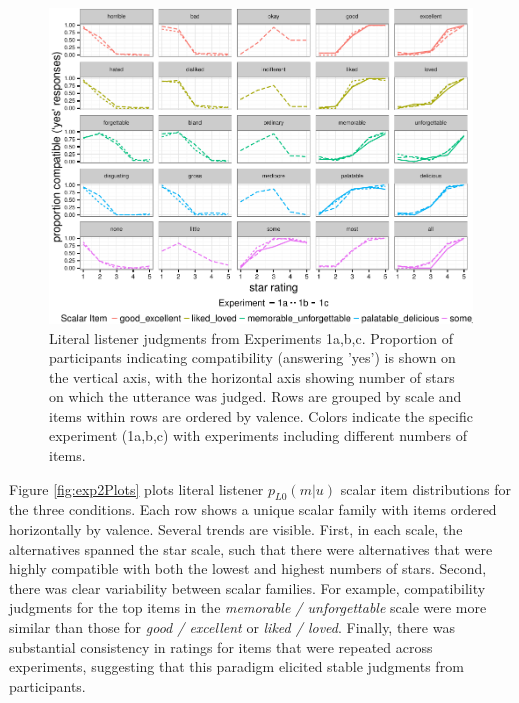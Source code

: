 \documentclass[10pt, letterpaper]{article}
\newenvironment{CodeChunk}{}{}
\begin{document}
\begin{CodeChunk}
\begin{figure}[t]

{\centering \includegraphics{figs/exp1Plots-1} 

}

\caption[Literal listener judgments from Experiments 1a,b,c]{Literal listener judgments from Experiments 1a,b,c. Proportion of participants indicating compatibility (answering 'yes') is shown on the vertical axis, with the horizontal axis showing number of stars on which the utterance was judged. Rows are grouped by scale and items within rows are ordered by valence. Colors indicate the specific experiment (1a,b,c) with experiments including different numbers of items.}\label{fig:exp1Plots}
\end{figure}
\end{CodeChunk}

Figure \ref{fig:exp2Plots} plots literal listener \(p_{L0}(m|u)\) scalar
item distributions for the three conditions. Each row shows a unique
scalar family with items ordered horizontally by valence. Several trends
are visible. First, in each scale, the alternatives spanned the star
scale, such that there were alternatives that were highly compatible
with both the lowest and highest numbers of stars. Second, there was
clear variability between scalar families. For example, compatibility
judgments for the top items in the \emph{memorable / unforgettable}
scale were more similar than those for \emph{good / excellent} or
\emph{liked / loved}. Finally, there was substantial consistency in
ratings for items that were repeated across experiments, suggesting that
this paradigm elicited stable judgments from participants.
\end{document}
